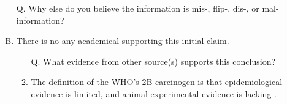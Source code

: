 \documentclass[a4paper, 12pt]{article}
\begin{document}
\begin{CJK*}{UTF8}{bsmi}
\begin{enumerate}[I.]
\begin{enumerate}[A.]
\begin{enumerate}[1.]
                              \end{enumerate}
                        \item [Q.] Why else do you believe the information is {\color{blue} mis}-, {\color{blue}flip}-, {\color{blue}dis}-, or {\color{blue}mal}-information?
                        \item There is no any academical supporting this initial claim.
                              \begin{enumerate}[1.]
                                    \item [Q.] What evidence from other source(s) supports this conclusion?
                                    \item The definition of the WHO's 2B carcinogen is that
                                          epidemiological evidence is limited, and animal experimental evidence is lacking \parencite{nhri}.
                              \end{enumerate}
                  \end{enumerate}
      \end{enumerate}

      \printbibliography[title=REFERENCES]

\end{CJK*}
\end{document}
